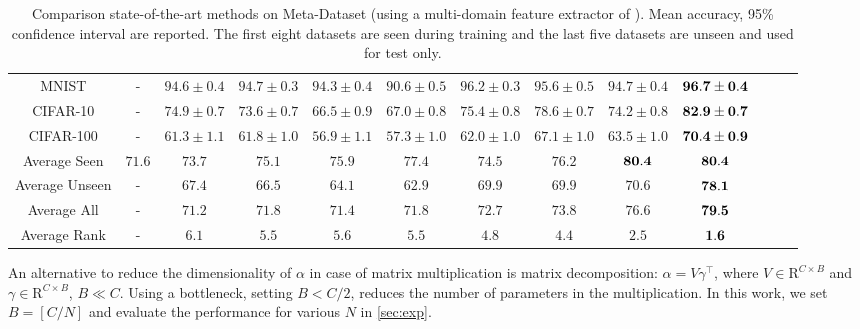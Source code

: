 \begin{table*}[t]
{\begin{tabular}{ccccccccccccc}
			MNIST & - & $94.6 \pm 0.4$ & $94.7 \pm 0.3$ & $94.3 \pm 0.4$ & $90.6 \pm 0.5$ & $96.2 \pm 0.3$ & $95.6 \pm 0.5$ & $94.7 \pm 0.4$ & ${\bf 96.7 \pm 0.4}$ \\
			CIFAR-10 & - & $74.9 \pm 0.7$ & $73.6 \pm 0.7$ & $66.5 \pm 0.9$ & $67.0 \pm 0.8$ & $75.4 \pm 0.8$ & $78.6 \pm 0.7$ & $74.2 \pm 0.8$ & ${\bf 82.9 \pm 0.7}$ \\
			CIFAR-100 & - & $61.3 \pm 1.1$ & $61.8 \pm 1.0$ & $56.9 \pm 1.1$ & $57.3 \pm 1.0$ & $62.0 \pm 1.0$ & $67.1 \pm 1.0$ & $63.5 \pm 1.0$ & ${\bf 70.4 \pm 0.9}$ \\
			\midrule
			Average Seen & $71.6$ & $73.7$ & $75.1$ & $75.9$ & $77.4$ & $74.5$ & $76.2$ & ${\bf 80.4}$ & ${\bf 80.4}$ \\
			Average Unseen & - & $67.4$ & $66.5$ & $64.1$ & $62.9$ & $69.9$ & $69.9$ & $70.6$ & ${\bf 78.1}$ \\
			Average All & - & $71.2$ & $71.8$ & $71.4$ & $71.8$ & $72.7$ & $73.8$ & $76.6$ & ${\bf 79.5}$ \\
			\midrule
			Average Rank & - & $6.1$ & $5.5$ & $5.6$ & $5.5$ & $4.8$ & $4.4$ & $2.5$ & ${\bf 1.6}$ \\
			\bottomrule
		\end{tabular}%
			}
		\vspace{-0.35cm}
		\caption{Comparison state-of-the-art methods on Meta-Dataset (using a multi-domain feature extractor of \cite{li2021universal}). Mean accuracy, 95\% confidence interval are reported. The first eight datasets are seen during training and the last five datasets are unseen and used for test only.}
		\label{tab:currmethod}
\end{table*}%


An alternative to reduce the dimensionality of $\alpha$ in case of matrix multiplication is matrix decomposition:
$\alpha=V\gamma^\top$, where $V\in\mathrm{R}^{C\times B}$ and $\gamma\in\mathrm{R}^{C\times B}$, $B\ll C$.
Using a bottleneck, \ie setting $B<C/2$, reduces the number of parameters in the multiplication.
In this work, we set $B=[C/N]$ and evaluate the performance for various $N$ in \cref{sec:exp}.



